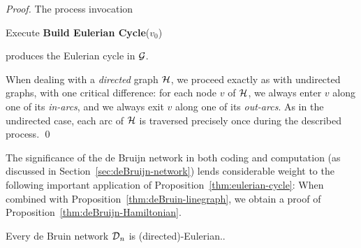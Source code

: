 \begin{proof}
\noindent
The process invocation

Execute {\bf Build Eulerian Cycle}($v_0$)

\noindent
produces the Eulerian cycle in $\mbox{$\cal G$}$.

\bigskip

When dealing with a {\em directed} graph $\mbox{$\cal H$}$, we proceed exactly as
with undirected graphs, with one critical difference: for each node
$v$ of $\mbox{$\cal H$}$, we always enter $v$ along one of its {\em in-arcs}, and
we always exit $v$ along one of its {\em out-arcs}.  As in the
undirected case, each arc of $\mbox{$\cal H$}$ is traversed precisely once during
the described process.  \qed
\end{proof}

\medskip

The significance of the de Bruijn network in both coding and
computation (as discussed in Section~\ref{sec:deBruijn-network}) lends
considerable weight to the following important application of
Proposition~\ref{thm:eulerian-cycle}:  When combined with
Proposition~\ref{thm:deBruin-linegraph}, we obtain a proof of 
Proposition~\ref{thm:deBruijn-Hamiltonian}.

\begin{corol}
\label{thm:deBruijn-Eulerian}
Every de Bruin network $\mbox{$\cal D$}_n$ is (directed)-Eulerian..
\end{corol}

